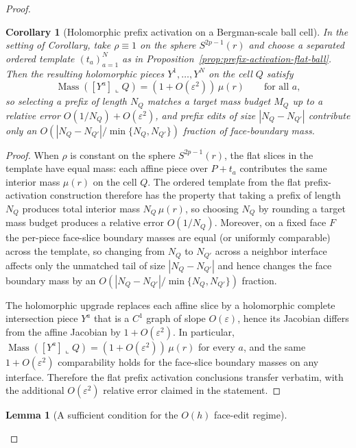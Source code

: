 \documentclass[11pt]{article}
\numberwithin{equation}{section}  %
\theoremstyle{plain}
\newtheorem{lemma}[theorem]{Lemma}
\newtheorem{corollary}[theorem]{Corollary}
\theoremstyle{definition}
\theoremstyle{remark}
\DeclareMathOperator{\Mass}{Mass}
\begin{document}
\begin{proof}
\begin{corollary}[Holomorphic prefix activation on a Bergman-scale ball cell]\label{cor:prefix-activation-holo}
In the setting of Corollary, take $\rho\equiv 1$ on the sphere $S^{2p-1}(r)$ and choose a separated ordered template
$(t_a)_{a=1}^{N}$ as in Proposition~\ref{prop:prefix-activation-flat-ball}.
Then the resulting holomorphic pieces $Y^1,\dots,Y^N$ on the cell $Q$ satisfy
\[
\Mass([Y^a]\llcorner Q)=(1+O(\varepsilon^2))\,\mu(r)
\qquad\text{for all }a,
\]
so selecting a prefix of length $N_Q$ matches a target mass budget $M_Q$ up to a relative error $O(1/N_Q)+O(\varepsilon^2)$, and prefix edits of size
$|N_Q-N_{Q'}|$ contribute only an $O(|N_Q-N_{Q'}|/\min\{N_Q,N_{Q'}\})$ fraction of face-boundary mass.
\end{corollary}
\begin{proof}
When $\rho$ is constant on the sphere $S^{2p-1}(r)$, the flat slices in the template have equal mass:
each affine piece over $P+t_a$ contributes the same interior mass $\mu(r)$ on the cell $Q$.
The ordered template from the flat prefix-activation construction therefore has the property that taking a prefix of length $N_Q$
produces total interior mass $N_Q\,\mu(r)$, so choosing $N_Q$ by rounding a target mass budget produces a relative error $O(1/N_Q)$.
Moreover, on a fixed face $F$ the per-piece face-slice boundary masses are equal (or uniformly comparable) across the template,
so changing from $N_Q$ to $N_{Q'}$ across a neighbor interface affects only the unmatched tail of size $|N_Q-N_{Q'}|$ and hence changes
the face boundary mass by an $O(|N_Q-N_{Q'}|/\min\{N_Q,N_{Q'}\})$ fraction.

The holomorphic upgrade replaces each affine slice by a holomorphic complete intersection piece $Y^a$ that is a $C^1$ graph of slope $O(\varepsilon)$,
hence its Jacobian differs from the affine Jacobian by $1+O(\varepsilon^2)$.
In particular,
\(
\Mass([Y^a]\llcorner Q)=(1+O(\varepsilon^2))\,\mu(r)
\)
for every $a$, and the same $1+O(\varepsilon^2)$ comparability holds for the face-slice boundary masses on any interface.
Therefore the flat prefix activation conclusions transfer verbatim, with the additional $O(\varepsilon^2)$ relative error claimed in the statement.
\end{proof}



\begin{lemma}[A sufficient condition for the $O(h)$ face-edit regime]\label{lem:oh-face-edit-regime}


\end{lemma}
\end{proof}
\end{document}
